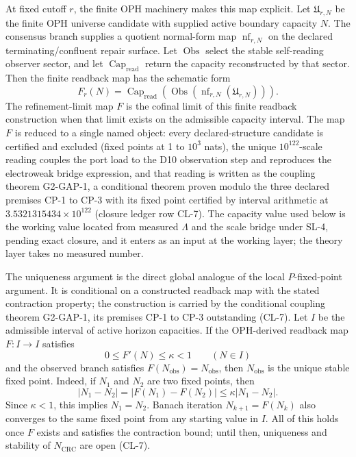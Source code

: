 At fixed cutoff \(r\), the finite OPH machinery makes this map explicit. Let \(\mathfrak U_{r,N}\)
be the finite OPH universe candidate with supplied active boundary capacity \(N\). The consensus
branch supplies a quotient normal-form map \(\operatorname{nf}_{r,N}\) on the declared
terminating/confluent repair surface. Let \(\operatorname{Obs}\) select the stable self-reading
observer sector, and let \(\operatorname{Cap}_{\mathrm{read}}\) return the capacity reconstructed
by that sector. Then the finite readback map has the schematic form
\[
F_r(N)=
\operatorname{Cap}_{\mathrm{read}}
\left(
\operatorname{Obs}\left(\operatorname{nf}_{r,N}(\mathfrak U_{r,N})\right)
\right).
\]
The refinement-limit map \(F\) is the cofinal limit of this finite readback construction when that
limit exists on the admissible capacity interval. The map \(F\) is reduced to a single named
object: every declared-structure candidate is certified and excluded (fixed points at 1 to
\(10^{3}\) nats), the unique \(10^{122}\)-scale reading couples the port load to the D10
observation step and reproduces the electroweak bridge expression, and that reading is
written as the coupling theorem G2-GAP-1, a conditional theorem proven modulo the three declared
premises CP-1 to CP-3 with its fixed point certified by interval arithmetic at
\(3.5321315434\times10^{122}\) (closure ledger row CL-7). The capacity value
used below is the working value located from measured \(\Lambda\) and the scale bridge under
SL-4, pending exact closure, and it enters as
an input at the working layer; the theory layer takes no measured number.

The uniqueness argument is the direct global analogue of the local \(P\)-fixed-point argument. It
is conditional on a constructed readback map with the stated contraction property; the
construction is carried by the conditional coupling theorem G2-GAP-1, its premises CP-1 to CP-3
outstanding (CL-7). Let
\(I\) be the admissible interval of active horizon capacities. If the OPH-derived readback map
\(F:I\to I\) satisfies
\[
0\le F'(N)\le \kappa<1
\qquad (N\in I)
\]
and the observed branch satisfies \(F(N_{\mathrm{obs}})=N_{\mathrm{obs}}\), then
\(N_{\mathrm{obs}}\) is the unique stable fixed point. Indeed, if \(N_1\) and \(N_2\) are two fixed
points, then
\[
|N_1-N_2|
=|F(N_1)-F(N_2)|
\le \kappa |N_1-N_2|.
\]
Since \(\kappa<1\), this implies \(N_1=N_2\). Banach iteration \(N_{k+1}=F(N_k)\) also converges
to the same fixed point from any starting value in \(I\). All of this holds once \(F\) exists and
satisfies the contraction bound; until then, uniqueness and stability of \(N_{\mathrm{CRC}}\) are
open (CL-7).

